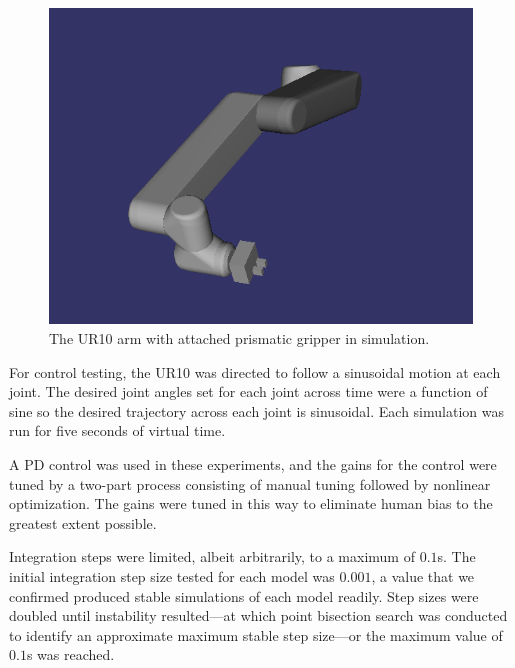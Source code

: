 \documentclass[conference]{IEEEtran}
\begin{document}
\begin{figure}[H]

\begin{center}
\includegraphics[scale=0.30]{UR10Arm.png}
\end{center}
\caption{The UR10 arm with attached prismatic gripper in simulation.\label{fig:UR10Arm}}
\end{figure}
For control testing, the UR10 was directed to follow a sinusoidal motion at each joint. The desired joint angles set for each joint across time were a function of sine so the desired trajectory across each joint is sinusoidal. Each simulation was run for five seconds of virtual time.

A PD control was used in these experiments, and the gains for the control were tuned by a two-part process consisting of manual tuning followed by nonlinear optimization. The gains were tuned in this way to eliminate human bias to the greatest extent possible. 

Integration steps were limited, albeit arbitrarily, to a maximum of $0.1$s. The initial integration step size tested for each model was $0.001$, a value that we confirmed produced stable simulations of each model readily. Step sizes were doubled until instability resulted---at which point bisection search was conducted to identify an approximate maximum stable step size---or the maximum value of $0.1$s was reached.
\end{document}
